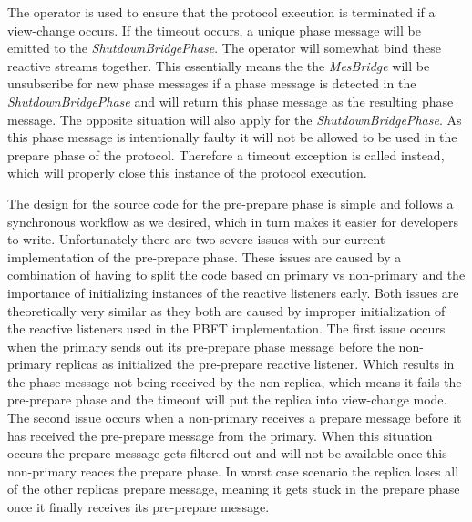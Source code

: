 The  operator is used to ensure that the protocol execution is terminated if a view-change occurs. If the timeout occurs, a unique phase message will be emitted to the  \emph{ShutdownBridgePhase}. The  operator will somewhat bind these reactive streams together. This essentially means the the \emph{MesBridge} will be unsubscribe for new phase messages if a phase message is detected in the \emph{ShutdownBridgePhase} and will return this phase message as the resulting phase message. The opposite situation will also apply for the \emph{ShutdownBridgePhase}. As this phase message is intentionally faulty it will not be allowed to be used in the prepare phase of the protocol. Therefore a timeout exception is called instead, which will properly close this instance of the protocol execution.

The design for the source code for the pre-prepare phase is simple and follows a synchronous workflow as we desired, which in turn makes it easier for developers to write. Unfortunately there are two severe issues with our current implementation of the pre-prepare phase. These issues are caused by a combination of having to split the code based on primary vs non-primary and the importance of initializing instances of the reactive listeners early. Both issues are theoretically very similar as they both are caused by improper initialization of the reactive listeners used in the PBFT implementation. The first issue occurs when the primary sends out its pre-prepare phase message before the non-primary replicas as initialized the pre-prepare reactive listener. Which results in the phase message not being received by the non-replica, which means it fails the pre-prepare phase and the timeout will put the replica into view-change mode. The second issue occurs when a non-primary receives a prepare message before it has received the pre-prepare message from the primary. When this situation occurs the prepare message gets filtered out and will not be available once this non-primary reaces the prepare phase. In worst case scenario the replica loses all of the other replicas prepare message, meaning it gets stuck in the prepare phase once it finally receives its pre-prepare message.

